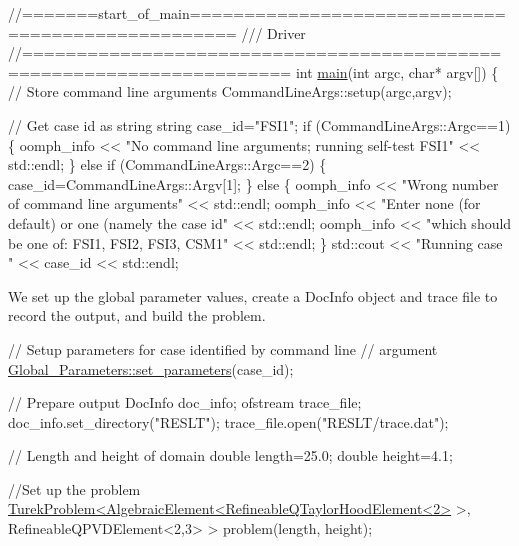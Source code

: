 \begin{DoxyCodeInclude}
\textcolor{comment}{//=======start\_of\_main==================================================}
\textcolor{comment}{/// Driver }
\textcolor{comment}{}\textcolor{comment}{//======================================================================}
\textcolor{keywordtype}{int} \hyperlink{turek__flag_8cc_a0ddf1224851353fc92bfbff6f499fa97}{main}(\textcolor{keywordtype}{int} argc, \textcolor{keywordtype}{char}* argv[])
\{
 \textcolor{comment}{// Store command line arguments}
 CommandLineArgs::setup(argc,argv);

 \textcolor{comment}{// Get case id as string}
 \textcolor{keywordtype}{string} case\_id=\textcolor{stringliteral}{"FSI1"};
 \textcolor{keywordflow}{if} (CommandLineArgs::Argc==1)
  \{
   oomph\_info << \textcolor{stringliteral}{"No command line arguments; running self-test FSI1"} 
              << std::endl;
  \}
 \textcolor{keywordflow}{else} \textcolor{keywordflow}{if} (CommandLineArgs::Argc==2)
  \{
   case\_id=CommandLineArgs::Argv[1];
  \}
 \textcolor{keywordflow}{else}
  \{
   oomph\_info << \textcolor{stringliteral}{"Wrong number of command line arguments"} << std::endl;
   oomph\_info << \textcolor{stringliteral}{"Enter none (for default) or one (namely the case id"} 
              << std::endl;
   oomph\_info << \textcolor{stringliteral}{"which should be one of: FSI1, FSI2, FSI3, CSM1"} 
              << std::endl;
  \} 
 std::cout << \textcolor{stringliteral}{"Running case "} << case\_id << std::endl;

\end{DoxyCodeInclude}


We set up the global parameter values, create a {\ttfamily Doc\+Info} object and trace file to record the output, and build the problem.


\begin{DoxyCodeInclude}

 \textcolor{comment}{// Setup parameters for case identified by command line}
 \textcolor{comment}{// argument}
 \hyperlink{namespaceGlobal__Parameters_a8c333f9041cad78d5c0160a8e2c169f5}{Global\_Parameters::set\_parameters}(case\_id);

 \textcolor{comment}{// Prepare output}
 DocInfo doc\_info;
 ofstream trace\_file; 
 doc\_info.set\_directory(\textcolor{stringliteral}{"RESLT"});
 trace\_file.open(\textcolor{stringliteral}{"RESLT/trace.dat"});
 
 \textcolor{comment}{// Length and height of domain}
 \textcolor{keywordtype}{double} length=25.0;
 \textcolor{keywordtype}{double} height=4.1;

 \textcolor{comment}{//Set up the problem}
 \hyperlink{classTurekProblem}{TurekProblem<AlgebraicElement<RefineableQTaylorHoodElement<2>}
       >,
  RefineableQPVDElement<2,3> > problem(length, height);

\end{DoxyCodeInclude}


